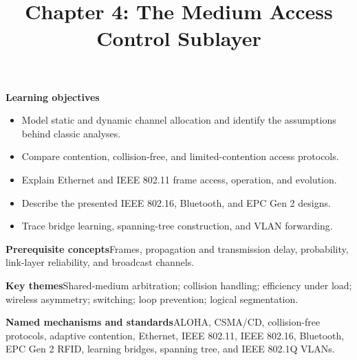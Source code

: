 \documentclass[10pt,letterpaper]{article}
\title{Chapter 4: The Medium Access Control Sublayer}
\author{}
\date{}
\begin{document}
\maketitle
{}
\begin{overviewbox}
\textbf{Learning objectives}\begin{itemize}
  \item Model static and dynamic channel allocation and identify the assumptions behind classic analyses.
  \item Compare contention, collision-free, and limited-contention access protocols.
  \item Explain Ethernet and IEEE 802.11 frame access, operation, and evolution.
  \item Describe the presented IEEE 802.16, Bluetooth, and EPC Gen 2 designs.
  \item Trace bridge learning, spanning-tree construction, and VLAN forwarding.
\end{itemize}
\textbf{Prerequisite concepts}\quad Frames, propagation and transmission delay, probability, link-layer reliability, and broadcast channels.\par
\textbf{Key themes}\quad Shared-medium arbitration; collision handling; efficiency under load; wireless asymmetry; switching; loop prevention; logical segmentation.\par
\textbf{Named mechanisms and standards}\quad ALOHA, CSMA/CD, collision-free protocols, adaptive contention, Ethernet, IEEE 802.11, IEEE 802.16, Bluetooth, EPC Gen 2 RFID, learning bridges, spanning tree, and IEEE 802.1Q VLANs.
\end{overviewbox}

\end{document}
